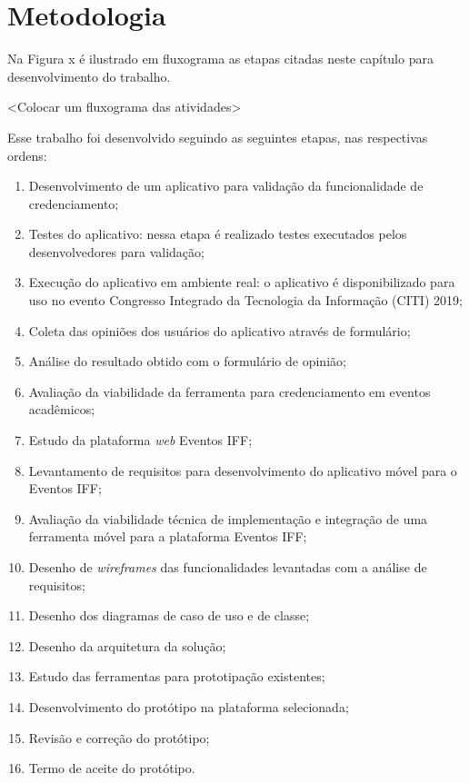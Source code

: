 \chapter{Metodologia}

Na Figura x é ilustrado em fluxograma as etapas citadas neste capítulo para desenvolvimento do trabalho.

<Colocar um fluxograma das atividades>

Esse trabalho foi desenvolvido seguindo as seguintes etapas, nas respectivas ordens: 

\begin{enumerate}
  \item Desenvolvimento de um aplicativo para validação da funcionalidade de credenciamento;
  \item Testes do aplicativo: nessa etapa é realizado testes executados pelos desenvolvedores para validação;
  \item Execução do aplicativo em ambiente real: o aplicativo é disponibilizado para uso no evento Congresso Integrado da Tecnologia da Informação (CITI) 2019;
  \item Coleta das opiniões dos usuários do aplicativo através de formulário;
  \item Análise do resultado obtido com o formulário de opinião;
  \item Avaliação da viabilidade da ferramenta para credenciamento em eventos acadêmicos;
  \item Estudo da plataforma \textit{web} Eventos IFF;
  \item Levantamento de requisitos para desenvolvimento do aplicativo móvel para o Eventos IFF;
  \item Avaliação da viabilidade técnica de implementação e integração de uma ferramenta móvel para a plataforma Eventos IFF;
  \item Desenho de \textit{wireframes} das funcionalidades levantadas com a análise de requisitos;
  \item Desenho dos diagramas de caso de uso e de classe;
  \item Desenho da arquitetura da solução;
  \item Estudo das ferramentas para prototipação existentes;
  \item Desenvolvimento do protótipo na plataforma selecionada;
  \item Revisão e correção do protótipo;
  \item Termo de aceite do protótipo.
\end{enumerate}